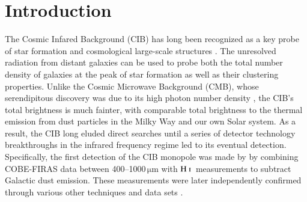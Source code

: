 \documentclass{aa}
\newcommand{\mathsc}[1]{{\normalfont\textsc{#1}}}
\newcommand{\hi}{\ensuremath{\mathsc {H\ i}}}
\begin{document}

   \maketitle

   \setcounter{tocdepth}{2}
   \tableofcontents


\section{Introduction}


The Cosmic Infared Background (CIB) has long been recognized as a key probe of star formation and cosmological large-scale structures \citep{partridge1967}. The unresolved radiation from distant galaxies can be used to probe both the total number density of galaxies at the peak of star formation as well as their clustering properties. Unlike the Cosmic Microwave Background (CMB), whose serendipitous discovery was due to its high photon number density \citep{penzias:1965}, the CIB's total brightness is much fainter, with comparable total brightness to the thermal emission from dust particles in the Milky Way and our own Solar system. As a result, the CIB long eluded direct searches until a series of detector technology breakthroughs in the infrared frequency regime led to its eventual detection. Specifically, the first detection of the CIB monopole was made by \citet{puget1996} by combining COBE-FIRAS data between 400--1000\,$\mathrm{\mu m}$ with \hi\ measurements to subtract Galactic dust emission. These measurements were later independently confirmed through various other techniques and data sets \citep[e.g.,][]{fixsen1998, schlegel1998, lagache:1999, penin:2012}. 
\end{document}
